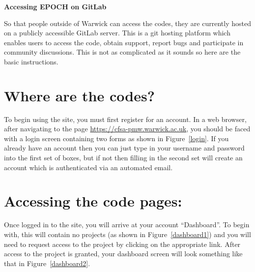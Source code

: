 
\usepackage[hmargin=.47in,vmargin=0.6in,nohead]{geometry}
\usepackage{nopageno}
\usepackage{titlesec}
\usepackage[scaled]{berasans}
\renewcommand*\familydefault{\sfdefault}  %
\usepackage[T1]{fontenc}


%
{\begin{center}\Large\bf Accessing EPOCH on GitLab\end{center}}\vspace{5mm}

\noindent
So that people outside of Warwick can access the codes, they are currently
hosted on a publicly accessible GitLab server. This is a git hosting platform
which enables users to access the code, obtain support, report bugs and
participate in community discussions.
This is not as complicated as it sounds so here are the basic instructions.

\section*{Where are the codes?}
To begin using the site, you must first register for an account. In a web
browser, after navigating to the page \url{https://cfsa-pmw.warwick.ac.uk}, you
should be faced with a login screen containing two forms as shown in
Figure~\ref{login}. If you already have an account then you can just type in
your username and password into the first set of boxes, but if not then filling
in the second set will create an account which is authenticated via an
automated email.


\section*{Accessing the code pages:}
Once logged in to the site, you will arrive at your account ``Dashboard''. To
begin with, this will contain no projects (as shown in Figure~\ref{dashboard1})
and you will need to request access to the {\EPOCH} project by clicking on the
appropriate link. After access to the project is granted, your dashboard screen
will look something like that in Figure~\ref{dashboard2}.


